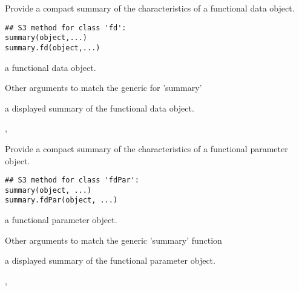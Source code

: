 \documentclass{article}
\begin{document}
\begin{Description}\relax
Provide a compact summary of the characteristics of a functional
data object.
\end{Description}
\begin{Usage}
\begin{verbatim}
## S3 method for class 'fd':
summary(object,...)
summary.fd(object,...)
\end{verbatim}
\end{Usage}
\begin{Arguments}
\begin{ldescription}
\item[\code{object}] a functional data object.

\item[\code{...}] Other arguments to match the generic for 'summary'
\end{ldescription}
\end{Arguments}
\begin{Value}
a displayed summary of the functional data object.
\end{Value}
\begin{SeeAlso}\relax
{},
\end{SeeAlso}

\begin{Description}\relax
Provide a compact summary of the characteristics of a functional
parameter object.
\end{Description}
\begin{Usage}
\begin{verbatim}
## S3 method for class 'fdPar':
summary(object, ...)
summary.fdPar(object, ...)
\end{verbatim}
\end{Usage}
\begin{Arguments}
\begin{ldescription}
\item[\code{object}] a functional parameter object.

\item[\code{...}] Other arguments to match the generic 'summary' function
\end{ldescription}
\end{Arguments}
\begin{Value}
a displayed summary of the functional parameter object.
\end{Value}
\begin{SeeAlso}\relax
{},
\end{SeeAlso}
\end{document}
